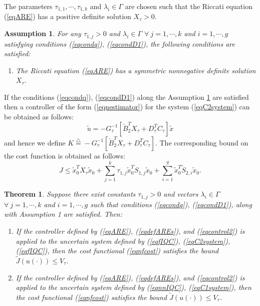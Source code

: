 \documentclass[twocolumn]{autart}
\newtheorem{theorem}{Theorem}
\newtheorem{assumption}{Assumption}
\newcommand{\eqdef}{\stackrel{\triangle}{=}}
\begin{document}
\noindent The parameters $\tau_{1,1},\cdots,\tau_{1,k}$ and $\lambda_i \in \Gamma$ are chosen such that the Riccati equation (\ref{eqARE}) has a positive definite solution $X_\tau >0$.
\begin{assumption}\label{Ass1}
For any $\tau_{1,j}>0$ and $\lambda_i \in \Gamma$ $\forall~j=1,\cdots,k$ and $i=1,\cdots,g$ satisfying conditions (\ref{eqcondq}), (\ref{eqcondD1}), the following conditions are satisfied:
\begin{enumerate}
\item The Riccati equation (\ref{eqARE}) has a symmetric nonnegative definite solution $X_\tau$.
\end{enumerate}
\end{assumption}
\vspace{0.2mm}
If the conditions (\ref{eqcondq}), (\ref{eqcondD1}) along the Assumption \ref{Ass1} are satisfied then a controller of the form (\ref{eqnestimator}) for the system (\ref{eqC2system}) can be obtained as follows:
\begin{equation}
\label{eqcontrol2}
\tilde{u}=-G_{\tau}^{-1}[\check{B}_2^T X_\tau + D_\tau^T C_\tau]\tilde{x}
\end{equation}
and hence we define $K\eqdef-G_{\tau}^{-1}[\check{B}_2^T X_\tau + D_\tau^T C_\tau]$.
The corresponding bound on the cost function is obtained as follows:
\begin{equation}
\label{eqbound}
J\leq \tilde{x}_0^T X_\tau \tilde{x}_0 + \sum_{j=1}^k \tau_{1,j} \tilde{x}_0^T S_{1,j} \tilde{x}_0 + \sum_{i=1}^g  \tilde{x}_0^T \tilde{S}_{2,i} \tilde{x}_0.
\end{equation}
\begin{theorem}
Suppose there exist constants $\tau_{1,j}>0$ and vectors $\lambda_i \in \Gamma$ $\forall~j=1,\cdots,k$ and $i=1,\cdots,g$ such that conditions (\ref{eqcondq}), (\ref{eqcondD1}), along with Assumption 1 are satisfied. Then:
\begin{enumerate}
\item If the controller defined by (\ref{eqARE}), (\ref{eqdefAREs}), and (\ref{eqcontrol2}) is applied to the uncertain system defined by (\ref{eqfIQC}), (\ref{eqC2system}), (\ref{eqfIQC}), then the cost functional (\ref{eqnfcost}) satisfies the bound $\tilde{J}(u(\cdot))\leq V_\tau$.
\item If the controller defined by (\ref{eqARE}), (\ref{eqdefAREs}), and (\ref{eqcontrol2}) is applied to the  uncertain system defined by (\ref{eqnnIQC}), (\ref{eqC1system}),  then the cost functional (\ref{eqnfcost}) satisfies the bound $\tilde{J}(u(\cdot))\leq V_\tau$.
\end{enumerate}
\end{theorem}
\end{document}
